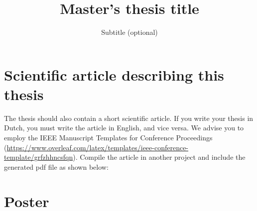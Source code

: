 \documentclass[11pt,a4paper]{report}
\title{Master's thesis title}
\subtitle{Subtitle (optional)}
\begin{document}
\preface%

\printnoidxglossary[type=\acronymtype]%

\thesiscontent


%
%

\finishthesiscontent

\printbibliography


\appendix


\chapter{Scientific article describing this thesis}
The thesis should also contain a short scientific article. If you write your thesis in Dutch, you must write the article in English, and vice versa. We advise you to employ the IEEE Manuscript Templates for Conference Proceedings (\url{https://www.overleaf.com/latex/templates/ieee-conference-template/grfzhhncsfqn}).
Compile the article in another project and include the generated pdf file as shown below:



\chapter{Poster}
%


\end{document}
